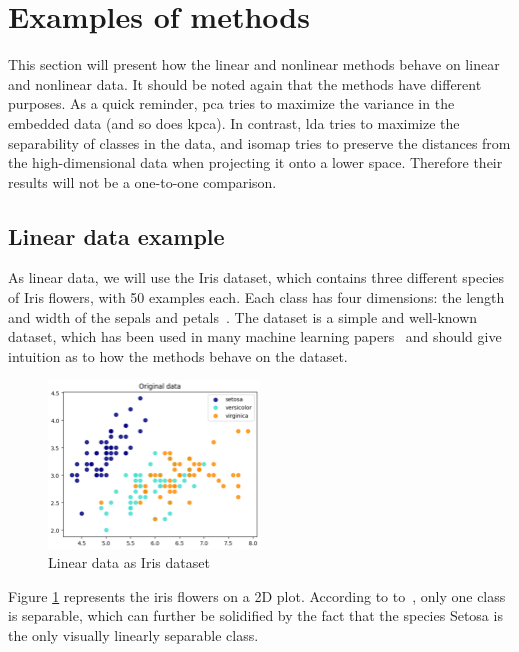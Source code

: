 \section{Examples of methods}\label{sec:examples-methods}
This section will present how the linear and nonlinear methods behave on linear and nonlinear data. It should be noted again that the methods have different purposes. As a quick reminder, \gls{pca} tries to maximize the variance in the embedded data (and so does \gls{kpca}). In contrast, \gls{lda} tries to maximize the separability of classes in the data, and \gls{isomap} tries to preserve the distances from the high-dimensional data when projecting it onto a lower space. Therefore their results will not be a one-to-one comparison.


\subsection{Linear data example}\label{subsec:linear-data-example}
As linear data, we will use the Iris dataset, which contains three different species of Iris flowers, with 50 examples each. Each class has four dimensions: the length and width of the sepals and petals~\cite{iris-dataset}. The dataset is a simple and well-known dataset, which has been used in many machine learning papers~\cite{iris-dataset} and should give intuition as to how the methods behave on the dataset.


\begin{figure}[htb!]
\centering
\includegraphics[width=0.5\textwidth]{figures/theory-example-figures/linear-data.png}
\caption{Linear data as Iris dataset}
\label{fig:linear-data}
\end{figure}

Figure \ref{fig:linear-data} represents the iris flowers on a 2D plot. According to to~\cite{iris-dataset}, only one class is separable, which can further be solidified by the fact that the species Setosa is the only visually linearly separable class.


